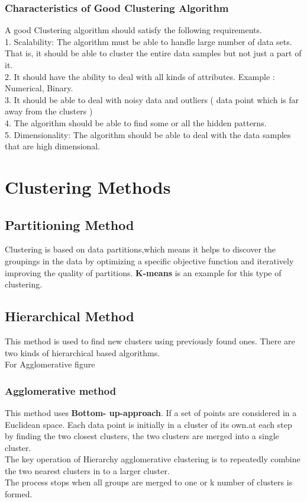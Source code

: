 \documentclass[11pt]{article}
\begin{document}
\subsubsection{Characteristics of Good Clustering Algorithm}
A good Clustering algorithm should satisfy the following requirements.\\
1. Scalability: The algorithm must be able to handle large number of data sets. That is, it should be able to cluster the entire data samples but not just a part of it.\\
2. It should have the ability to deal with all kinds of attributes. Example : Numerical, Binary.\\
3. It should be able to deal with noisy data and outliers ( data point which is far away from the clusters )\\
4. The algorithm should be able to find some or all the hidden patterns.\\
5. Dimensionality: The algorithm should be able to deal with the data samples that are high dimensional.\\ 

\section{Clustering Methods}

\subsection{Partitioning Method}
Clustering is based on data partitions,which means it helps to discover the groupings in the data by optimizing a specific objective function and iteratively improving the quality of partitions. \textbf{K-means} is an example for this type of clustering.\\
\subsection{Hierarchical Method}
This method is used to find new clusters using previously found ones. There are two kinds of hierarchical based algorithms.\\
For Agglomerative figure \cite{fig_2}
\subsubsection{Agglomerative method}
This method uses \textbf{Bottom- up-approach}.
If a set of points are considered in a Euclidean space. Each data point is initially  in a cluster of its own.at each step by finding the two closest clusters, the two clusters are merged into a single cluster.\\
The key operation of Hierarchy agglomerative clustering is to repeatedly combine the two nearest clusters in to a larger cluster.\\
The process stops when all groups are merged to one or k number of clusters is formed.
\end{document}
